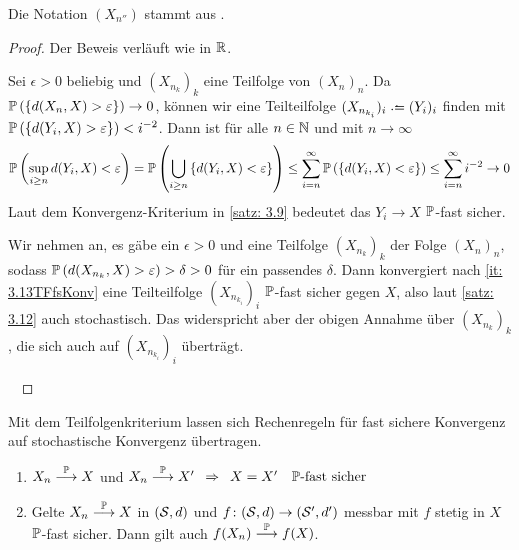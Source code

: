 Die Notation $(X_{n''})$ stammt aus \cite{billingsley2008probability}.

\begin{proof}
	Der Beweis verläuft wie in $\R$.
	\begin{description}
		\hinrichtung Sei $\epsilon > 0$ beliebig und $(X_{n_k})_k$ eine Teilfolge von $(X_n)_n$.
		Da $\P\brackets{\menge{d(X_n, X) > \epsilon}} \to 0$, können wir eine Teilteilfolge $(X_{n_{k_i}})_i \defeq (Y_i)_i$ finden mit $\P\brackets{\menge{d(Y_i, X) > \epsilon}} < i^{-2}$. Dann ist für alle $n \in \N$ und mit $n \to \infty$
		\begin{align*}
			\P\brackets{\sup_{i \ge n} d(Y_i, X) < \epsilon}
			= \P\brackets{\bigcup_{i \ge n} \menge{d(Y_i, X) < \epsilon}}
			\leq \sum_{i = n}^{\infty} \P\brackets{\menge{d(Y_i, X) < \epsilon}}
			\leq \sum_{i = n}^{\infty} i^{-2} \to 0 
		\end{align*}
		Laut dem Konvergenz-Kriterium in \cref{satz: 3.9} bedeutet das $Y_i \to X$ $\P$-fast sicher.
		
		\rueckrichtung Wir nehmen an, es gäbe ein $\epsilon > 0$ und eine Teilfolge $(X_{n_k})_k$ der Folge $(X_n)_n$, sodass $\P\brackets{d(X_{n_k}, X) > \epsilon} > \delta > 0$ für ein passendes $\delta$.
		Dann konvergiert nach \cref{it: 3.13TFfsKonv} eine Teilteilfolge $(X_{n_{k_i}})_i$ $\P$-fast sicher gegen $X$, also laut \cref{satz: 3.12} auch stochastisch. 
		Das widerspricht aber der obigen Annahme über $(X_{n_k})_k$, die sich
		auch auf $(X_{n_{k_i}})_i$ überträgt.
	\end{description}
	~
\end{proof}

Mit dem Teilfolgenkriterium lassen sich Rechenregeln für fast sichere Konvergenz auf stochastische Konvergenz übertragen.

\begin{korollar} \label{korollar: 3.14}
	\begin{enumerate}[label=(\alph*)]
		\item \label{it: 3.14probConvEq} $X_n \probto X$ und $X_n \probto X'
			\follows X = X'\quad\P\text{-fast sicher}$
		\item \label{it: 3.14probConvCont} Gelte $X_n \probto X$ in $(\S,d)$ und $f \colon (\S,d) \to (\S',d')$ messbar mit $f$ stetig in $X$ $\P$-fast sicher. Dann gilt auch $f(X_n) \probto f(X)$.
	\end{enumerate}
\end{korollar}

